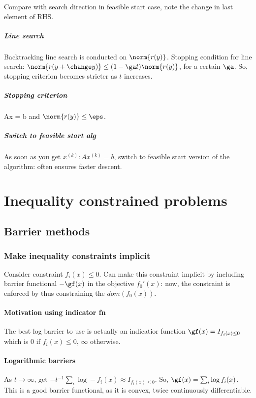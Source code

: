 \documentclass[oneside, article]{memoir}
\begin{document}
Compare with search direction in feasible start case, note the change in last element of RHS.


\paragraph*{Line search}
Backtracking line search is conducted on $\norm{r(y)}$. Stopping condition for line search: $\norm{r(y + \change y)} \leq (1 - \ga t)\norm{r(y)}$, for a certain $\ga$. So, stopping criterion becomes stricter as $t$ increases.

\paragraph*{Stopping criterion}
Ax = b and $\norm{r(y)} \leq \eps$.

\paragraph*{Switch to feasible start alg}
As soon as you get $x^{(k)}: Ax^{(k)} = b$, switch to feasible start version of the algorithm: often ensures faster descent.

\chapter{Inequality constrained problems}
\section{Barrier methods}
\subsection{Make inequality constraints implicit}
Consider constraint $f_i(x) \leq 0$. Can make this constraint implicit by including barrier functional $-\gf(x)$ in the objective $f_0'(x)$: now, the constraint is enforced by thus constraining the $dom(f_0(x))$.

\subsubsection{Motivation using indicator fn}
The best log barrier to use is actually an indicatior function $\gf(x) = I_{f_i(x)\leq 0}$ which is 0 if $f_i(x)\leq 0$, $\infty$ otherwise.

\subsubsection{Logarithmic barriers}
As $t \to \infty$, get $-t^{-1}\sum_i \log -f_i(x) \approx I_{f_i(x)\leq 0}$. So, $\gf(x) = \sum_i \log f_i(x)$. This is a good barrier functional, as it is convex, twice continuously differentiable.
\end{document}
